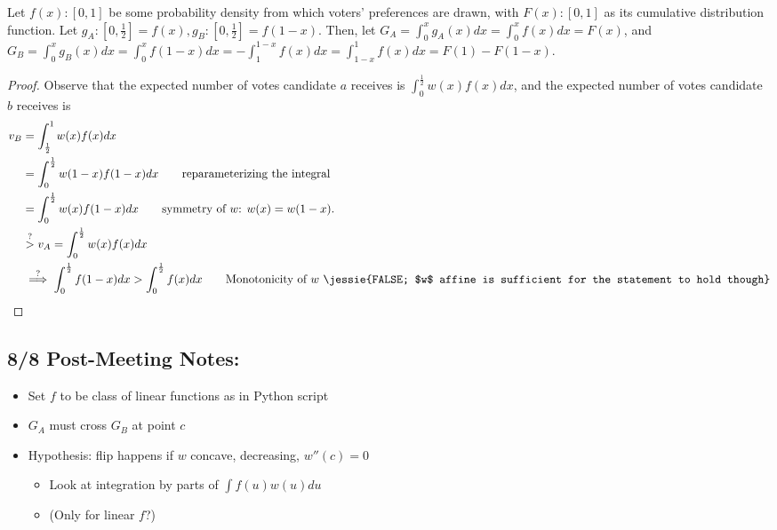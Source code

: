 \documentclass[12pt]{article}
\begin{document}
    Let $f(x): [0,1]$ be some probability density from which voters' preferences are drawn, with $F(x): [0,1]$ as its cumulative distribution function. Let $g_A: [0, \frac{1}{2}] = f(x), g_B: [0, \frac{1}{2}] = f(1 - x)$. Then, let $G_A = \int_0^xg_A(x)dx =  \int_0^xf(x)dx = F(x)$, and $G_B = \int_0^xg_B(x)dx = \int_0^xf(1 - x)dx = -\int_1^{1-x}f(x)dx = \int_{1-x}^1f(x)dx = F(1) - F(1-x)$.
         
\begin{proof}
Observe that the expected number of votes candidate $a$ receives is $\int_0^{\frac 1 2} w(x) f(x) dx$, and the expected number of votes candidate $b$ receives is 
\begin{align*}
v_B &= \int_{\frac 1 2}^1 w(x) f(x) dx\\
&= \int_{0}^{\frac 1 2} w(1-x) f(1-x) dx \qquad \text{reparameterizing the integral} \\
&= \int_{0}^{\frac 1 2} w(x) f(1-x) dx \qquad \text{symmetry of $w$: $w(x) = w(1-x)$.} \\
&\overset{?}{>} v_A = \int_{0}^{\frac 1 2} w(x) f(x) dx \\
&\overset{?}{\implies} \int_{0}^{\frac 1 2} f(1-x) dx > \int_{0}^{\frac 1 2} f(x) dx \qquad \text{Monotonicity of $w$ \jessie{FALSE; $w$ affine is sufficient for the statement to hold though}}
\end{align*}
\end{proof}

\subsection*{8/8 Post-Meeting Notes:}

\begin{itemize}[nolistsep]
    \item Set $f$ to be class of linear functions as in Python script
    \item $G_A$ must cross $G_B$ at point $c$
    \item Hypothesis: flip happens if $w$ concave, decreasing, $w''(c)=0$
        \begin{itemize}[nolistsep]
            \item Look at integration by parts of $\int f(u) w(u) du$
            \item (Only for linear $f$?)
        \end{itemize}
\end{itemize}
\end{document}
